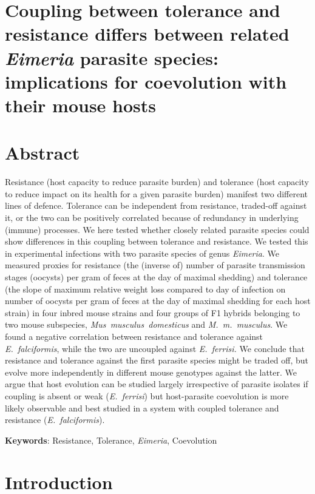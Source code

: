 \documentclass[12pt]{article}
\begin{document}
\section*{Coupling between tolerance and resistance differs between related \textit{Eimeria} parasite species: implications for coevolution with their mouse hosts}

\section*{Abstract}
Resistance (host capacity to reduce parasite burden) and tolerance (host capacity to reduce impact on its health for a given parasite burden) manifest two different lines of defence. Tolerance can be independent from resistance, traded-off against it, or the two can be positively correlated because of redundancy in underlying (immune) processes. We here tested whether closely related parasite species could show differences in this coupling between tolerance and resistance. 
We tested this in experimental infections with two parasite species of genus \textit{Eimeria}. We measured proxies for resistance (the (inverse of) number of parasite transmission stages (oocysts) per gram of feces at the day of maximal shedding) and tolerance (the slope of maximum relative weight loss compared to day of infection on number of oocysts per gram of feces at the day of maximal shedding for each host strain) in four inbred mouse strains and four groups of F1 hybrids belonging to two mouse subspecies, \textit{Mus~musculus~domesticus} and \textit{M.~m.~musculus}.
We found a negative correlation between resistance and tolerance against \textit{E.~falciformis}, while the two are uncoupled against \textit{E.~ferrisi.} We conclude that resistance and tolerance against the first parasite species might be traded off, but evolve more independently in different mouse genotypes against the latter. We argue that host evolution can be studied largely irrespective of parasite isolates if coupling is absent or weak (\textit{E.~ferrisi}) but host-parasite coevolution is more likely observable and best studied in a system with coupled tolerance and resistance (\textit{E.~falciformis}). 

\textbf{Keywords}: Resistance, Tolerance, \textit{Eimeria}, Coevolution

\section*{Introduction}
\end{document}
